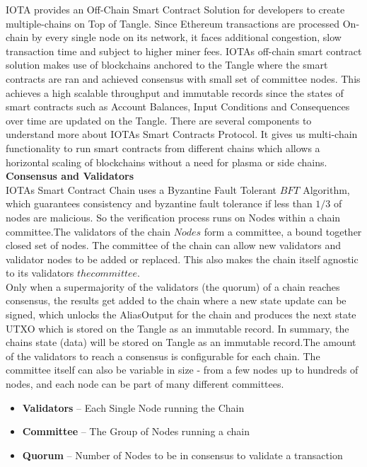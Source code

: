 \documentclass[10pt]{article}
\begin{document}
IOTA provides an Off-Chain Smart Contract Solution for developers to create multiple-chains on Top of Tangle. Since Ethereum transactions are processed On-chain by every single node on its network, it faces additional congestion, slow transaction time and subject to higher miner fees. IOTA\textsc{}s off-chain smart contract solution makes use of blockchains anchored to the Tangle where the smart contracts are ran and achieved consensus with small set of committee nodes. This achieves a high scalable throughput and immutable records since the states of smart contracts such as Account Balances, Input Conditions and Consequences over time are updated on the Tangle. There are several components to understand more about IOTA\textsc{}s Smart Contracts Protocol. It gives us multi-chain functionality to run smart contracts from different chains which allows a horizontal scaling of blockchains without a need for plasma or side chains.\\

\textbf{Consensus and Validators}\\

IOTA\textsc{}s Smart Contract Chain uses a Byzantine Fault Tolerant \(BFT\) Algorithm, which guarantees consistency and byzantine fault tolerance if less than $1/3$ of nodes are malicious. So the verification process runs on Nodes within a chain committee.The validators of the chain \(Nodes\) form a committee, a bound together closed set of nodes. The committee of the chain can allow new validators and validator nodes to be added or replaced. This also makes the chain itself agnostic to its validators \(the committee\).\\

Only when a supermajority of the validators (the quorum) of a chain reaches consensus, the results get added to the chain where a new state update can be signed, which unlocks the AliasOutput for the chain and produces the next state UTXO which is stored on the Tangle as an immutable record. In summary, the chain\textsc{}s state (data) will be stored on Tangle as an immutable record.The amount of the validators to reach a consensus is configurable for each chain. The committee itself can also be variable in size - from a few nodes up to hundreds of nodes, and each node can be part of many different committees.

\begin{itemize}[leftmargin=+0.2in]
\item \textbf{Validators} – Each Single Node running the Chain
\item \textbf{Committee} – The Group of Nodes running a chain
\item \textbf{Quorum} – Number of Nodes to be in consensus to validate a transaction
\end{itemize}
\end{document}
